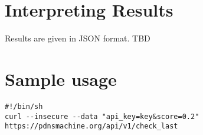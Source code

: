 \documentclass[a4paper]{article}
\begin{document}
\section{Interpreting Results}
\label{sec-5}

Results are given in JSON format. TBD

\section{Sample usage}
\label{sec-6}

\lstset{language=sh,label= ,caption= ,numbers=none}
\begin{lstlisting}
#!/bin/sh
curl --insecure --data "api_key=key&score=0.2" https://pdnsmachine.org/api/v1/check_last
\end{lstlisting}
\end{document}
